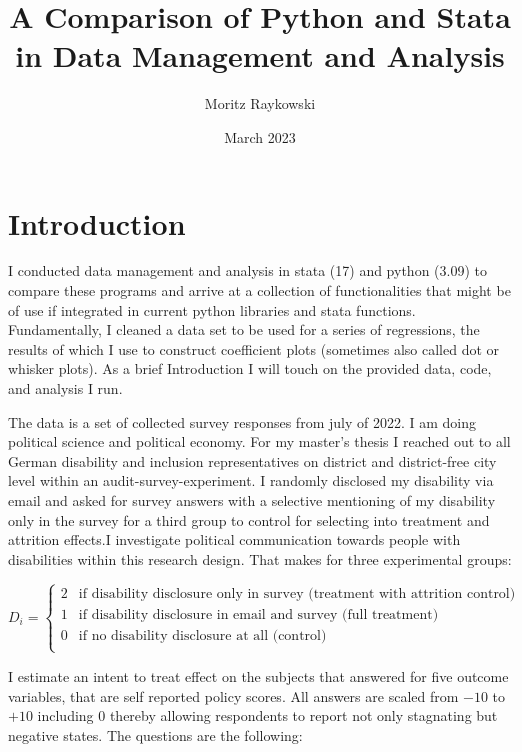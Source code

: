 \documentclass[10pt]{article}
\title{A Comparison of Python and Stata in Data Management and Analysis
}
\author{Moritz Raykowski}
\date{March 2023}
\begin{document}
\section{Introduction}
I conducted data management and analysis in stata (17) and python (3.09) to compare these programs 
and arrive at a collection of functionalities that might be of use if integrated in current python 
libraries and stata functions.
Fundamentally, I cleaned a data set to be used for a series of regressions, the results of which 
I use to construct coefficient plots (sometimes also called dot or whisker plots).
As a brief Introduction I will touch on the provided data, code, and analysis I run.

The data is a set of collected survey responses from july of 2022. I am doing political science and political economy.
For my master's thesis I reached out to all German disability and inclusion representatives on district and district-free city 
level within an audit-survey-experiment. I randomly disclosed my disability via email and asked for survey answers 
with a selective mentioning of my disability only in the survey for a third group to control for selecting into 
treatment and attrition effects.I investigate political communication towards people with disabilities 
within this research design. That makes for three experimental groups:

\begin{equation}
    D_{i} = \begin{cases}
          2 & \text{if disability disclosure only in survey (treatment with attrition control)}\\
          1 & \text{if disability disclosure in email and survey (full treatment)}\\
          0 & \text{if no disability disclosure at all (control)}\\
        \end{cases} 
    \end{equation}

I estimate an intent to treat effect on the subjects that answered for five outcome variables, that are 
self reported policy scores. 
All answers are scaled from $-10$ to $+10$ including $0$ thereby allowing respondents to report 
not only stagnating but negative states. The questions are the following:
\end{document}
